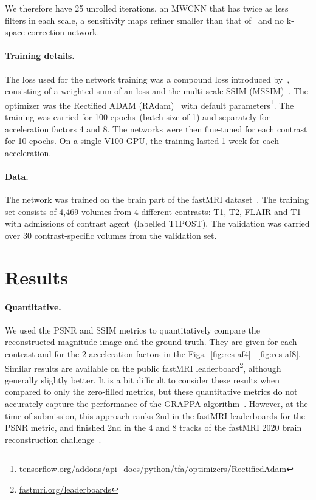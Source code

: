 \documentclass{article}
\begin{document}
We therefore have 25 unrolled iterations, an MWCNN that has twice as less filters in each scale, a sensitivity maps refiner smaller than that of~\cite{Sriram2020End-to-EndReconstruction} and no k-space correction network.

\paragraph{Training details.} The loss used for the network training was a compound loss introduced by~\cite{Pezzotti2020AnChallenge}, consisting of a weighted sum of an  loss and the multi-scale SSIM (MSSIM)~\cite{Wang2004}.
The optimizer was the Rectified ADAM (RAdam)~\cite{Liu2020OnBeyond} with default parameters\footnote{\href{https://www.tensorflow.org/addons/api_docs/python/tfa/optimizers/RectifiedAdam}{tensorflow.org/addons/api\_docs/python/tfa/optimizers/RectifiedAdam}}.
The training was carried for 100 epochs~(batch size of 1) and separately for acceleration factors 4 and 8. 
The networks were then fine-tuned for each contrast for 10 epochs.
On a single V100 GPU, the training lasted 1 week for each acceleration.

\paragraph{Data.} The network was trained on the brain part of the fastMRI dataset~\cite{Zbontar}.
The training set consists of 4,469 volumes from 4 different contrasts: T1, T2, FLAIR and T1 with admissions of contrast agent~(labelled T1POST). The validation was carried over 30 contrast-specific volumes from the validation set.


\section{Results}

\paragraph{Quantitative.}
We used the PSNR and SSIM metrics to quantitatively compare the reconstructed magnitude image and the ground truth.
They are given for each contrast and for the 2 acceleration factors in the Figs.~\ref{fig:res-af4}-~\ref{fig:res-af8}.
Similar results are available on the public fastMRI leaderboard\footnote{\href{https://fastmri.org/leaderboards/}{fastmri.org/leaderboards}}, although generally slightly better.
It is a bit difficult to consider these results when compared to only the zero-filled metrics, but these quantitative metrics do not accurately capture the performance of the GRAPPA algorithm~\cite{Griswold2002GeneralizedGRAPPA}.
However, at the time of submission, this approach ranks 2nd in the fastMRI leaderboards for the PSNR metric, and finished 2nd in the 4 and 8 tracks of the fastMRI 2020 brain reconstruction challenge~\cite{Muckley2020State-of-the-artChallenge}.
\end{document}
